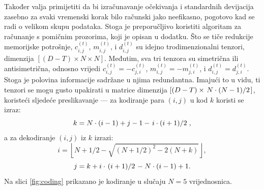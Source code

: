 \documentclass[lmodern, utf8, diplomski, numeric]{fer}
\newcommand{\q}{\left}
\newcommand{\w}{\right}
\begin{document}
  Također valja primijetiti da bi izračunavanje očekivanja i standardnih devijacija zasebno za svaki vremenski korak bilo računski jako neefikasno, pogotovo kad se radi o velikom skupu podataka.
  Stoga je preporučljivo koristiti algoritam za računanje s pomičnim prozorima, koji je opisan u dodatku.
  Što se tiče redukcije memorijske potrošnje, $c_{i,j}^{\q(t\w)}$, $m_{i,j}^{\q(t\w)}$, i $d_{i,j}^{\q(t\w)}$ su idejno trodimenzionalni tenzori, dimenzija $\q[(D - T) \times N \times N\w]$.
  Međutim, sva tri tenzora su simetrična ili antisimetrična, odnosno vrijedi $c_{i,j}^{\q(t\w)} = -c_{j,i}^{\q(t\w)}$, $m_{i,j}^{\q(t\w)} = -m_{j,i}^{\q(t\w)}$, i $d_{i,j}^{\q(t\w)} = d_{j,i}^{\q(t\w)}$. Stoga je polovina informacije sadržane u njima redundantna.
  Imajući to u vidu, ti tenzori se mogu gusto upakirati u matrice dimenzija $\q[(D - T) \times \q. N\cdot(N - 1) \middle/ 2\w.\w]$, koristeći sljedeće preslikavanje --- za kodiranje para $(i,j)$ u kod $k$ koristi se izraz:
  \begin{equation} k = N \cdot (i - 1) + j - 1 - \q. i \cdot (i + 1) \middle/ 2\w., \end{equation}
  a za dekodiranje $(i, j)$ iz $k$ izrazi:
  \begin{equation} i = \q \lfloor N + 1/2 - \sqrt{(N + 1/2)^2 - 2(N + k)} \w \rfloor, \end{equation}
  \begin{equation} j = k + i \cdot \q.(i + 1) \middle/ 2\w. - N \cdot (i - 1) + 1. \end{equation}
  Na slici \ref{fig:coding} prikazano je kodiranje u slučaju $N = 5$ vrijednosnica.
  
\end{document}
